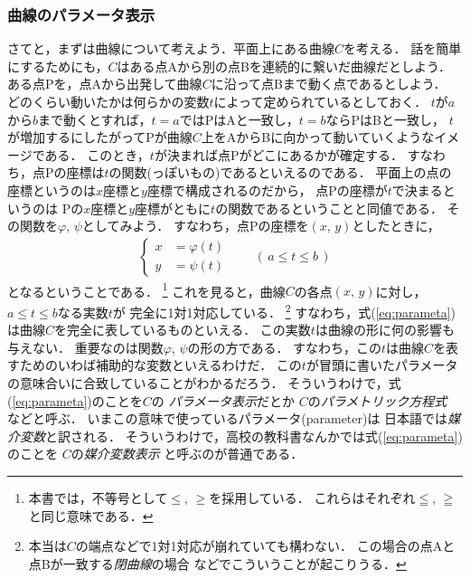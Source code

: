 \subsubsection{曲線のパラメータ表示}
さてと，まずは曲線について考えよう．平面上にある曲線$C$を考える．
話を簡単にするためにも，$C$はある点Aから別の点Bを連続的に繋いだ曲線だとしよう．
ある点Pを，点Aから出発して曲線$C$に沿って点Bまで動く点であるとしよう．
どのくらい動いたかは何らかの変数$t$によって定められているとしておく．
$t$が$a$から$b$まで動くとすれば，$t=a$ではPはAと一致し，$t=b$ならPはBと一致し，
$t$が増加するにしたがってPが曲線$C$上をAからBに向かって動いていくようなイメージである．
このとき，$t$が決まれば点Pがどこにあるかが確定する．
すなわち，点Pの座標は$t$の関数(っぽいもの)であるといえるのである．
平面上の点の座標というのは$x$座標と$y$座標で構成されるのだから，
点Pの座標が$t$で決まるというのは
Pの$x$座標と$y$座標がともに$t$の関数であるということと同値である．
その関数を$\varphi, \, \psi$としてみよう．
すなわち，点Pの座標を$(x, \, y)$としたときに，
\begin{align}
\left\{
\begin{aligned}
x & = \varphi(t) \\ 
y & = \psi (t) 
\end{aligned}
\right.
\qquad ( \, a \leq t \leq b \, )
\label{eq:parameta}
\end{align}
となるということである．
\footnote{本書では，不等号として$\leq, \, \geq$を採用している．
これらはそれぞれ$\leqq, \, \geqq$と同じ意味である．}
これを見ると，曲線$C$の各点$(x, \, y)$に対し，$a \leq t \leq b$なる実数$t$が
完全に1対1対応している．
\footnote{本当は$C$の端点などで1対1対応が崩れていても構わない．
この場合の点Aと点Bが一致する\emph{閉曲線}の場合
などでこういうことが起こりうる．}
すなわち，式(\ref{eq:parameta})は曲線$C$を完全に表しているものといえる．
この実数$t$は曲線の形に何の影響も与えない．
重要なのは関数$\varphi, \, \psi$の形の方である．
すなわち，この$t$は曲線$C$を表すためのいわば補助的な変数といえるわけだ．
この$t$が冒頭に書いたパラメータの意味合いに合致していることがわかるだろう．
そういうわけで，式(\ref{eq:parameta})のことを$C$の
\emph{パラメータ表示}だとか
$C$の\emph{パラメトリック方程式}
などと呼ぶ．
いまこの意味で使っているパラメータ(parameter)は
日本語では\emph{媒介変数}と訳される．
そういうわけで，高校の教科書なんかでは式(\ref{eq:parameta})のことを
$C$の\emph{媒介変数表示}
と呼ぶのが普通である．

